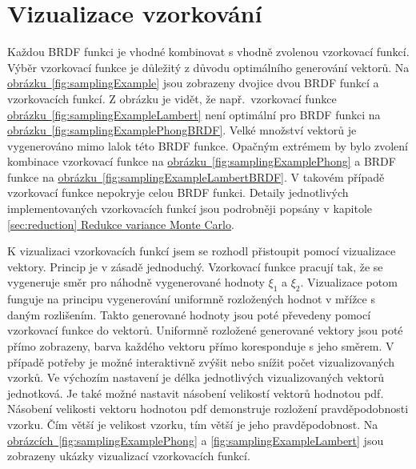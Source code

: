 \documentclass[czech,master]{diploma}
\newcommand{\randU}{\xi_{1}}
\newcommand{\randV}{\xi_{2}}
\begin{document}
\section{Vizualizace vzorkování} \label{sec:samplingViz}
Každou BRDF funkci je vhodné kombinovat s vhodně zvolenou vzorkovací funkcí. Výběr vzorkovací funkce je důležitý z důvodu optimálního generování vektorů. Na \hyperref[fig:samplingExample]{obrázku~\ref{fig:samplingExample}} jsou zobrazeny dvojice dvou BRDF funkcí a vzorkovacích funkcí. Z obrázku je vidět, že např.\ vzorkovací funkce \hyperref[fig:samplingExampleLambert]{obrázku~\ref{fig:samplingExampleLambert}} není optimální pro  BRDF funkci na \hyperref[fig:samplingExamplePhongBRDF]{obrázku~\ref{fig:samplingExamplePhongBRDF}}. Velké množství vektorů je vygenerováno mimo lalok této BRDF funkce. Opačným extrémem by bylo zvolení kombinace vzorkovací funkce na \hyperref[fig:samplingExamplePhong]{obrázku~\ref{fig:samplingExamplePhong}} a BRDF funkce na \hyperref[fig:samplingExampleLambertBRDF]{obrázku~\ref{fig:samplingExampleLambertBRDF}}. V takovém případě vzorkovací funkce nepokryje celou BRDF funkci. Detaily jednotlivých implementovaných vzorkovacích funkcí jsou podrobněji popsány v kapitole \hyperref[sec:reduction]{\ref{sec:reduction} Redukce variance Monte Carlo}.\par
K vizualizaci vzorkovacích funkcí jsem se rozhodl přistoupit pomocí vizualizace vektory. Princip je v zásadě jednoduchý. Vzorkovací funkce pracují tak, že se vygeneruje směr pro náhodně vygenerované hodnoty \(\randU\) a \(\randV\). Vizualizace potom funguje na principu vygenerování uniformně rozložených hodnot v mřížce s daným rozlišením. Takto generované hodnoty jsou poté převedeny pomocí vzorkovací funkce do vektorů. Uniformně rozložené generované vektory jsou poté přímo zobrazeny, barva každého vektoru přímo koresponduje s jeho směrem. V případě potřeby je možné interaktivně zvýšit nebo snížit počet vizualizovaných vzorků. Ve výchozím nastavení je délka jednotlivých vizualizovaných vektorů jednotková. Je také možné nastavit násobení velikostí vektorů hodnotou pdf. Násobení velikosti vektoru hodnotou pdf demonstruje rozložení pravděpodobnosti vzorku. Čím větší je velikost vzorku, tím větší je jeho pravděpodobnost. Na \hyperref[fig:samplingExamplePhong]{obrázcích~\ref{fig:samplingExamplePhong}} a \hyperref[fig:samplingExampleLambert]{\ref{fig:samplingExampleLambert}} jsou zobrazeny ukázky vizualizací vzorkovacích funkcí.
\end{document}
